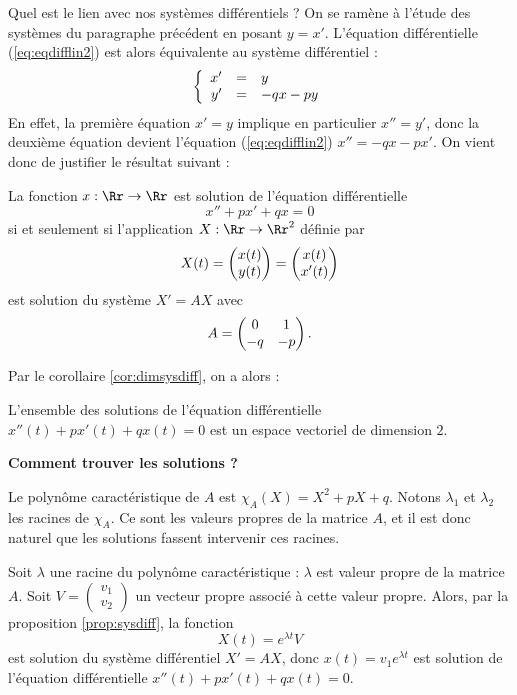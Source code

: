 \documentclass[12pt, class=report,crop=false]{standalone}
\begin{document}
\bigskip

Quel est le lien avec nos systèmes différentiels ?
On se ramène à l'étude des systèmes du paragraphe précédent en posant $y=x'$. 
L'équation différentielle (\ref{eq:eqdifflin2}) est alors équivalente au système différentiel :
$$\left\{\begin{array}{rcl}
x'&=& y\cr 
y'&=& -qx-py
\end{array}\right.$$
En effet, la première équation $x'=y$ implique en particulier $x'' = y'$, donc la deuxième équation
devient l'équation (\ref{eq:eqdifflin2}) $x'' = -qx-px'$.
On vient donc de justifier le résultat suivant :
\begin{proposition}
La fonction $x: \Rr \rightarrow \Rr$ est solution de l'équation différentielle 
$$x''+px'+qx=0$$ si et seulement si l'application $X : \Rr \rightarrow \Rr^2$ définie par 
$$X(t)=\begin{pmatrix}x(t)\cr y(t)\end{pmatrix}=
\begin{pmatrix}x(t)\cr x'(t)\end{pmatrix}$$ 
est solution du système $X'=AX$ avec
$$A=\begin{pmatrix}0&1\cr-q&-p\end{pmatrix}.$$ 
\end{proposition} 

Par le corollaire \ref{cor:dimsysdiff}, on a alors :
\begin{corollaire}
\label{cor:dimeqdiff}
L'ensemble des solutions de l'équation différentielle $x''(t)+px'(t)+qx(t)=0$ est
un espace vectoriel de dimension $2$.
\end{corollaire}

\bigskip

\textbf{Comment trouver les solutions ?}

Le polynôme caractéristique de $A$ est $\chi_A(X)=X^2+pX+q$.
Notons $\lambda_1$ et $\lambda_2$ les racines de $\chi_A$.
Ce sont les valeurs propres de la matrice $A$, et il est donc
 naturel que les solutions fassent intervenir ces racines. 
 
Soit $\lambda$ une racine du polynôme caractéristique : 
$\lambda$ est valeur propre de la matrice $A$. Soit 
$V = \left(\begin{smallmatrix} v_1 \\ v_2 \end{smallmatrix} \right)$ un vecteur propre associé à cette valeur propre. Alors, par la proposition \ref{prop:sysdiff},
la fonction 
$$X(t) =  e^{\lambda t} V$$
est solution du système différentiel $X'=AX$, donc 
$x(t) = v_1 e^{\lambda t}$ est solution de l'équation différentielle $x''(t) + px'(t) + qx(t) = 0$.
\end{document}

